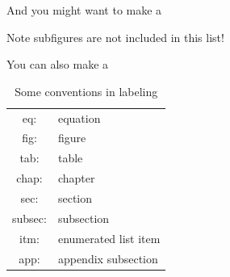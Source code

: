 \documentclass[thesis]{subfiles}
\begin{document}
And you might want to make a 
\listoffigures
Note subfigures are not included in this list!

You can also make a \listoftables

\begin{table}[b] %
	\centering
	\begin{tabular}{c|l}
		eq:&	equation \\ 
		fig:&	figure \\
		tab:&	table \\
		chap: &	chapter \\
		sec:&	section \\
		subsec:&	subsection \\
		itm:&	enumerated list item \\
		app:&	appendix subsection
	\end{tabular}
	\caption{Some conventions in labeling}
	\label{tab:conventions}
\end{table}
\end{document}
